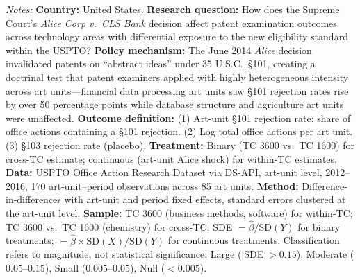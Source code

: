 \begin{table}[H]
\centering
\caption{Standardized Effect Sizes for Main Outcomes}
\label{tab:sde}

\vspace{0.3em}
\begin{minipage}{\textwidth}
\footnotesize
\textit{Notes:}
\textbf{Country:} United States.
\textbf{Research question:} How does the Supreme Court's \textit{Alice Corp v.\ CLS Bank} decision affect patent examination outcomes across technology areas with differential exposure to the new eligibility standard within the USPTO?
\textbf{Policy mechanism:} The June 2014 \textit{Alice} decision invalidated patents on ``abstract ideas'' under 35 U.S.C.\ \S101, creating a doctrinal test that patent examiners applied with highly heterogeneous intensity across art units---financial data processing art units saw \S101 rejection rates rise by over 50 percentage points while database structure and agriculture art units were unaffected.
\textbf{Outcome definition:} (1) Art-unit \S101 rejection rate: share of office actions containing a \S101 rejection. (2) Log total office actions per art unit. (3) \S103 rejection rate (placebo).
\textbf{Treatment:} Binary (TC 3600 vs.\ TC 1600) for cross-TC estimate; continuous (art-unit Alice shock) for within-TC estimates.
\textbf{Data:} USPTO Office Action Research Dataset via DS-API, art-unit level, 2012--2016, 170 art-unit--period observations across 85 art units.
\textbf{Method:} Difference-in-differences with art-unit and period fixed effects, standard errors clustered at the art-unit level.
\textbf{Sample:} TC 3600 (business methods, software) for within-TC; TC 3600 vs.\ TC 1600 (chemistry) for cross-TC.
SDE $= \hat{\beta} / \text{SD}(Y)$ for binary treatments; $= \hat{\beta} \times \text{SD}(X) / \text{SD}(Y)$ for continuous treatments.
Classification refers to magnitude, not statistical significance: Large ($|$SDE$| > 0.15$), Moderate ($0.05$--$0.15$), Small ($0.005$--$0.05$), Null ($< 0.005$).
\end{minipage}
\end{table}
